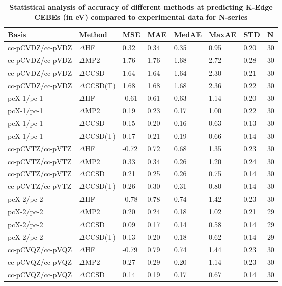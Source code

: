 \begin{table}
  \caption{\textbf{Statistical analysis of accuracy of different methods at predicting K-Edge CEBEs (in eV) compared to experimental data for N-series}}
  \begin{tabular}{l l l l l l l l }
    \toprule
    \textbf{Basis} & \textbf{Method} & \textbf{MSE} & \textbf{MAE} & \textbf{MedAE} & \textbf{MaxAE} & \textbf{STD} & \textbf{N} \\ 
    \midrule
    cc-pCVDZ/cc-pVDZ & $\Delta$HF & 0.32 & 0.34 & 0.35 & 0.95 & 0.20 & 30 \\ 
    cc-pCVDZ/cc-pVDZ & $\Delta$MP2 & 1.76 & 1.76 & 1.68 & 2.72 & 0.28 & 30 \\ 
    cc-pCVDZ/cc-pVDZ & $\Delta$CCSD & 1.64 & 1.64 & 1.64 & 2.30 & 0.21 & 30 \\ 
    cc-pCVDZ/cc-pVDZ & $\Delta$CCSD(T) & 1.68 & 1.68 & 1.68 & 2.36 & 0.22 & 30 \\ 
    pcX-1/pc-1 & $\Delta$HF & -0.61 & 0.61 & 0.63 & 1.14 & 0.20 & 30 \\ 
    pcX-1/pc-1 & $\Delta$MP2 & 0.19 & 0.23 & 0.17 & 1.00 & 0.22 & 30 \\ 
    pcX-1/pc-1 & $\Delta$CCSD & 0.15 & 0.20 & 0.16 & 0.63 & 0.13 & 30 \\ 
    pcX-1/pc-1 & $\Delta$CCSD(T) & 0.17 & 0.21 & 0.19 & 0.66 & 0.14 & 30 \\ 
    cc-pCVTZ/cc-pVTZ & $\Delta$HF & -0.72 & 0.72 & 0.68 & 1.35 & 0.23 & 30 \\ 
    cc-pCVTZ/cc-pVTZ & $\Delta$MP2 & 0.33 & 0.34 & 0.26 & 1.20 & 0.24 & 30 \\ 
    cc-pCVTZ/cc-pVTZ & $\Delta$CCSD & 0.21 & 0.25 & 0.26 & 0.75 & 0.14 & 30 \\ 
    cc-pCVTZ/cc-pVTZ & $\Delta$CCSD(T) & 0.26 & 0.30 & 0.31 & 0.80 & 0.14 & 30 \\ 
    pcX-2/pc-2 & $\Delta$HF & -0.78 & 0.78 & 0.74 & 1.42 & 0.23 & 30 \\ 
    pcX-2/pc-2 & $\Delta$MP2 & 0.20 & 0.24 & 0.18 & 1.02 & 0.21 & 29 \\ 
    pcX-2/pc-2 & $\Delta$CCSD & 0.09 & 0.17 & 0.14 & 0.58 & 0.14 & 29 \\ 
    pcX-2/pc-2 & $\Delta$CCSD(T) & 0.13 & 0.20 & 0.18 & 0.62 & 0.14 & 29 \\ 
    cc-pCVQZ/cc-pVQZ & $\Delta$HF & -0.79 & 0.79 & 0.74 & 1.44 & 0.23 & 30 \\ 
    cc-pCVQZ/cc-pVQZ & $\Delta$MP2 & 0.27 & 0.29 & 0.20 & 1.14 & 0.23 & 30 \\ 
    cc-pCVQZ/cc-pVQZ & $\Delta$CCSD & 0.14 & 0.19 & 0.17 & 0.67 & 0.14 & 30 \\ 

\end{tabular}
\end{table}
